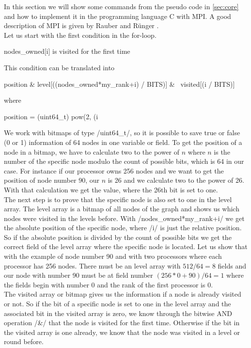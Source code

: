 \documentclass[12pt,a4paper]{article}
\begin{document}
In this section we will show some commands from the pseudo code in \ref{sec:core} and how to implement it in the programming language C with MPI. A good description of MPI is given by Rauber and R{\"u}nger \cite{rauber}. \\
Let us start with the first condition in the for-loop. 
\begin{ccode}
nodes_owned[i] is visited for the first time
\end{ccode}
This condition can be translated into
\begin{ccode}
position & level[((nodes_owned*my_rank+i) / BITS)] & ~visited[(i / BITS)]
\end{ccode}
where 
\begin{ccode}
position = (uint64_t) pow(2, (i %
\end{ccode}
We work with bitmaps of type \cinline/uint64_t/, so it is possible to save true or false (0 or 1) information of 64 nodes in one variable or field. To get the position of a node in a bitmap, we have to calculate two to the power of \(n\) where \(n\) is the number of the specific node modulo the count of possible bits, which is 64 in our case. For instance if our processor owns 256 nodes and we want to get the position of node number 90, our \(n\) is 26 and we calculate two to the power of 26. With that calculation we get the value, where the 26th bit is set to one.\\
The next step is to prove that the specific node is also set to one in the level array. The level array is a bitmap of all nodes of the graph and shows us which nodes were visited in the levels before. With \cinline/nodes_owned*my_rank+i/ we get the absolute position of the specific node, where \cinline/i/ is just the relative position. So if the absolute position is divided by the count of possible bits we get the correct field of the level array where the specific node is located. Let us show that with the example of node number 90 and with two processors where each processor has 256 nodes. There must be an level array with \(512/64 = 8\) fields and our node with number 90 must be at field number \((256*0+90) / 64 = 1\) where the fields begin with number 0 and the rank of the first processor is 0.\\
The visited array or bitmap gives us the information if a node is already visited or not. So if the bit of a specific node is set to one in the level array and the associated bit in the visited array is zero, we know through the bitwise AND operation \cinline/&/ that the node is visited for the first time. Otherwise if the bit in the visited array is one already, we know that the node was visited in a level or round before.\\
\end{document}
